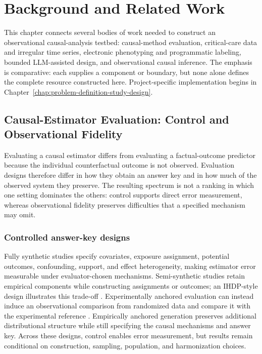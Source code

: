 \chapter{Background and Related Work}
\label{chap:background-related-work}

This chapter connects several bodies of work needed to construct an observational causal-analysis testbed: causal-method evaluation, critical-care data and irregular time series, electronic phenotyping and programmatic labeling, bounded LLM-assisted design, and observational causal inference.  The emphasis is comparative: each supplies a component or boundary, but none alone defines the complete resource constructed here.  Project-specific implementation begins in Chapter~\ref{chap:problem-definition-study-design}.

\section{Causal-Estimator Evaluation: Control and Observational Fidelity}
\label{sec:background-related-work:causal-estimator-evaluation-spectrum}

Evaluating a causal estimator differs from evaluating a factual-outcome predictor because the individual counterfactual outcome is not observed.  Evaluation designs therefore differ in how they obtain an answer key and in how much of the observed system they preserve.  The resulting spectrum is not a ranking in which one setting dominates the others: control supports direct error measurement, whereas observational fidelity preserves difficulties that a specified mechanism may omit.

\subsection{Controlled answer-key designs}

Fully synthetic studies specify covariates, exposure assignment, potential outcomes, confounding, support, and effect heterogeneity, making estimator error measurable under evaluator-chosen mechanisms.  Semi-synthetic studies retain empirical components while constructing assignments or outcomes; an IHDP-style design illustrates this trade-off \cite{shalit2017ite}.  Experimentally anchored evaluation can instead induce an observational comparison from randomized data and compare it with the experimental reference \cite{gentzel2021experimental}.  Empirically anchored generation preserves additional distributional structure while still specifying the causal mechanisms and answer key.  Across these designs, control enables error measurement, but results remain conditional on construction, sampling, population, and harmonization choices.

